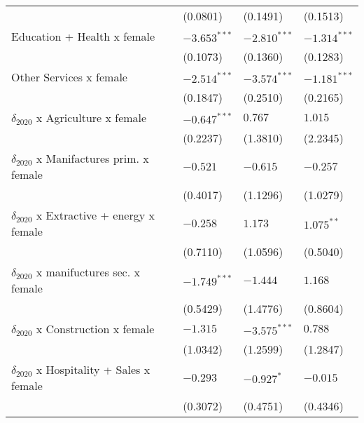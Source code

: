 \begin{tabular}{llll}
                                                   &           (0.0801) &           (0.1491) &           (0.1513) \\
Education + Health x female                        &     $-3.653^{***}$ &     $-2.810^{***}$ &     $-1.314^{***}$ \\
                                                   &           (0.1073) &           (0.1360) &           (0.1283) \\
Other Services x female                            &     $-2.514^{***}$ &     $-3.574^{***}$ &     $-1.181^{***}$ \\
                                                   &           (0.1847) &           (0.2510) &           (0.2165) \\
$\delta_{2020}$ x Agriculture x female             &     $-0.647^{***}$ &            $0.767$ &            $1.015$ \\
                                                   &           (0.2237) &           (1.3810) &           (2.2345) \\
$\delta_{2020}$ x Manifactures prim. x female      &           $-0.521$ &           $-0.615$ &           $-0.257$ \\
                                                   &           (0.4017) &           (1.1296) &           (1.0279) \\
$\delta_{2020}$ x Extractive + energy x female     &           $-0.258$ &            $1.173$ &       $1.075^{**}$ \\
                                                   &           (0.7110) &           (1.0596) &           (0.5040) \\
$\delta_{2020}$ x manifuctures sec. x female       &     $-1.749^{***}$ &           $-1.444$ &            $1.168$ \\
                                                   &           (0.5429) &           (1.4776) &           (0.8604) \\
$\delta_{2020}$ x Construction x female            &           $-1.315$ &     $-3.575^{***}$ &            $0.788$ \\
                                                   &           (1.0342) &           (1.2599) &           (1.2847) \\
$\delta_{2020}$ x Hospitality + Sales x female     &           $-0.293$ &         $-0.927^*$ &           $-0.015$ \\
                                                   &           (0.3072) &           (0.4751) &           (0.4346) \\

\end{tabular}
